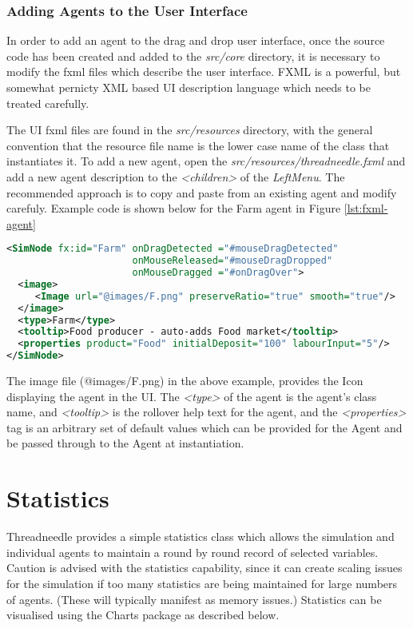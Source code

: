 \documentclass[10pt,oneside,openright, a4paper]{memoir}
\begin{document}
\subsection{Adding Agents to the User Interface}
\label{ch:fxml}
In order to add an agent to the drag and drop user interface, once the
source code has been created and added to the \emph{src/core} directory, 
it is necessary to modify the fxml files which describe the user interface.
FXML is a powerful, but somewhat pernicty XML based UI description language 
which needs to be treated carefully.
\par
The UI fxml files are found in the \emph{src/resources} directory, with the 
general convention that the resource file name is the lower case
name of the class that instantiates it. To add a new agent, open the
\emph{src/resources/threadneedle.fxml} and add a new agent
description to the \emph{<children>} of the \emph{LeftMenu}. The recommended
approach is to copy and paste from an existing agent and modify carefuly.
Example code is shown below for the Farm agent in Figure \ref{lst:fxml-agent} 
\begin{lstlisting}[caption=Agent FXML,label=lst:fxml-agent,language=xml]
<SimNode fx:id="Farm" onDragDetected ="#mouseDragDetected"
                      onMouseReleased="#mouseDragDropped"
                      onMouseDragged ="#onDragOver">
  <image>
     <Image url="@images/F.png" preserveRatio="true" smooth="true"/>
  </image>
  <type>Farm</type>
  <tooltip>Food producer - auto-adds Food market</tooltip>
  <properties product="Food" initialDeposit="100" labourInput="5"/>
</SimNode>
\end{lstlisting}
The image file (@images/F.png) in the above example, provides the Icon displaying
the agent in the UI. The \emph{<type>} of the agent is the agent's class name, 
and \emph{<tooltip>} is the rollover help text for the agent, and
the \emph{<properties>} tag is an arbitrary set of default values which
can be provided for the Agent and be passed through to the Agent at
instantiation. 
\chapter{Statistics}
Threadneedle provides a simple statistics class which allows the
simulation and individual agents to maintain a round by round
record of selected variables. Caution is advised with the statistics
capability, since it can create scaling issues for the simulation
if too many statistics are being maintained for large numbers of agents. 
(These will typically manifest as memory issues.) Statistics can 
be visualised using the Charts package as described below.
\end{document}

